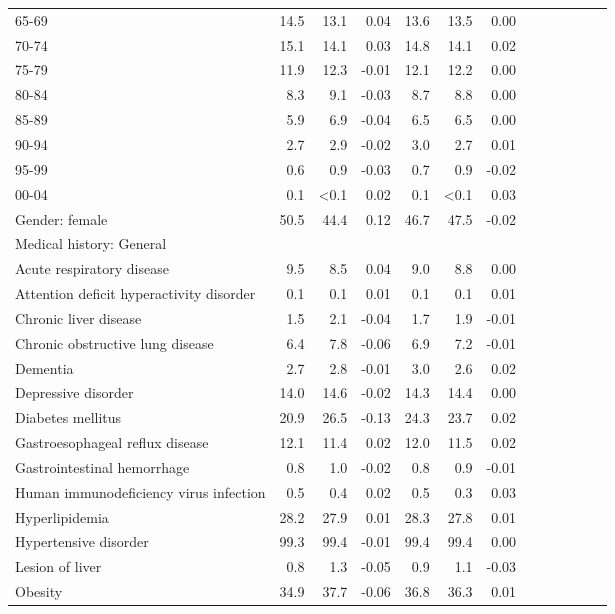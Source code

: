 \documentclass[11pt,]{article}
\begin{document}
\begin{longtable}{lrrrrrrrrrrrr}
      65-69 & 14.5 & 13.1 &  0.04 & 13.6 & 13.5 &  0.00 \\ 
      70-74 & 15.1 & 14.1 &  0.03 & 14.8 & 14.1 &  0.02 \\ 
      75-79 & 11.9 & 12.3 & -0.01 & 12.1 & 12.2 &  0.00 \\ 
      80-84 &  8.3 &  9.1 & -0.03 &  8.7 &  8.8 &  0.00 \\ 
      85-89 &  5.9 &  6.9 & -0.04 &  6.5 &  6.5 &  0.00 \\ 
      90-94 &  2.7 &  2.9 & -0.02 &  3.0 &  2.7 &  0.01 \\ 
      95-99 &  0.6 &  0.9 & -0.03 &  0.7 &  0.9 & -0.02 \\ 
      00-04 &  0.1 & <0.1 &  0.02 &  0.1 & <0.1 &  0.03 \\ 
  Gender: female & 50.5 & 44.4 &  0.12 & 46.7 & 47.5 & -0.02 \\ 
  Medical history: General &    &    &     &    &    &     \\ 
      Acute respiratory disease &  9.5 &  8.5 &  0.04 &  9.0 &  8.8 &  0.00 \\ 
      Attention deficit hyperactivity disorder &  0.1 &  0.1 &  0.01 &  0.1 &  0.1 &  0.01 \\ 
      Chronic liver disease &  1.5 &  2.1 & -0.04 &  1.7 &  1.9 & -0.01 \\ 
      Chronic obstructive lung disease &  6.4 &  7.8 & -0.06 &  6.9 &  7.2 & -0.01 \\ 
      Dementia &  2.7 &  2.8 & -0.01 &  3.0 &  2.6 &  0.02 \\ 
      Depressive disorder & 14.0 & 14.6 & -0.02 & 14.3 & 14.4 &  0.00 \\ 
      Diabetes mellitus & 20.9 & 26.5 & -0.13 & 24.3 & 23.7 &  0.02 \\ 
      Gastroesophageal reflux disease & 12.1 & 11.4 &  0.02 & 12.0 & 11.5 &  0.02 \\ 
      Gastrointestinal hemorrhage &  0.8 &  1.0 & -0.02 &  0.8 &  0.9 & -0.01 \\ 
      Human immunodeficiency virus infection &  0.5 &  0.4 &  0.02 &  0.5 &  0.3 &  0.03 \\ 
      Hyperlipidemia & 28.2 & 27.9 &  0.01 & 28.3 & 27.8 &  0.01 \\ 
      Hypertensive disorder & 99.3 & 99.4 & -0.01 & 99.4 & 99.4 &  0.00 \\ 
      Lesion of liver &  0.8 &  1.3 & -0.05 &  0.9 &  1.1 & -0.03 \\ 
      Obesity & 34.9 & 37.7 & -0.06 & 36.8 & 36.3 &  0.01 \\ 

\end{longtable}
\end{document}

